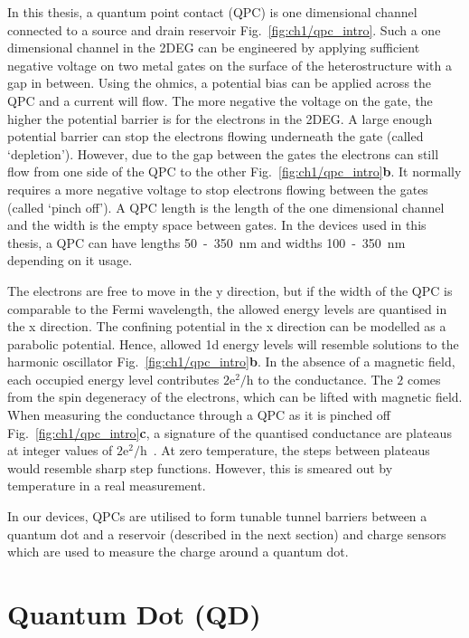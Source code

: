 In this thesis, a quantum point contact (QPC) is one dimensional channel connected to a source and drain reservoir Fig.~\ref{fig:ch1/qpc_intro}. Such a one dimensional channel in the 2DEG can be engineered by applying sufficient negative voltage on two metal gates on the surface of the heterostructure with a gap in between. Using the ohmics, a potential bias can be applied across the QPC and a current will flow. The more negative the voltage on the gate, the higher the potential barrier is for the electrons in the 2DEG. A large enough potential barrier can stop the electrons flowing underneath the gate (called `depletion'). However, due to the gap between the gates the electrons can still flow from one side of the QPC to the other Fig.~\ref{fig:ch1/qpc_intro}\textbf{b}. It normally requires a more negative voltage to stop electrons flowing between the gates (called `pinch off'). A QPC length is the length of the one dimensional channel and the width is the empty space between gates. In the devices used in this thesis, a QPC can have lengths 50~-~\qty{350}{nm} and widths 100~-~\qty{350}{nm} depending on it usage.

The electrons are free to move in the y direction, but if the width of the QPC is comparable to the Fermi wavelength, the allowed energy levels are quantised in the x direction. The confining potential in the x direction can be modelled as a parabolic potential. Hence, allowed 1d energy levels will resemble solutions to the harmonic oscillator Fig.~\ref{fig:ch1/qpc_intro}\textbf{b}. In the absence of a magnetic field, each occupied energy level contributes $\mathrm{2e^2/h}$ to the conductance. The $2$ comes from the spin degeneracy of the electrons, which can be lifted with magnetic field. When measuring the conductance through a QPC as it is pinched off Fig.~\ref{fig:ch1/qpc_intro}\textbf{c}, a signature of the quantised conductance are plateaus at integer values of $\mathrm{2e^2/h}$~\cite{qpc_first_measurement}. At zero temperature, the steps between plateaus would resemble sharp step functions. However, this is smeared out by temperature in a real measurement.

In our devices, QPCs are utilised to form tunable tunnel barriers between a quantum dot and a reservoir (described in the next section) and charge sensors~\cite{cs_first_measurement} which are used to measure the charge around a quantum dot. 




\afterpage{\clearpage}
\section{Quantum Dot (QD)}

